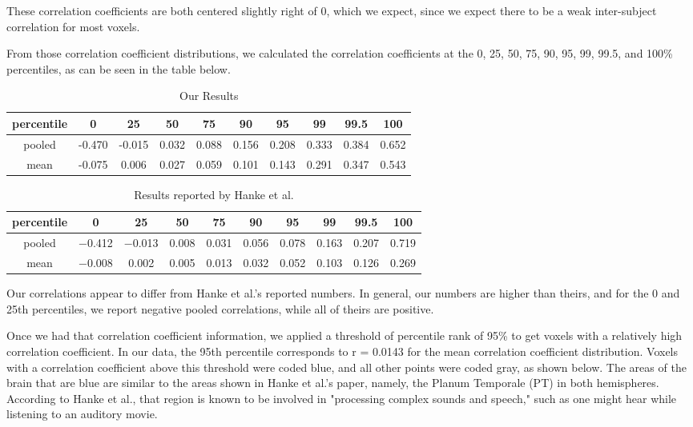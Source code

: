 \documentclass[11pt]{article}
\begin{document}
These correlation coefficients are both centered slightly right of
0, which we expect, since we expect there to be a weak inter-subject
correlation for most voxels.

From those correlation coefficient distributions, we calculated the 
correlation coefficients at the 0, 25, 50, 75, 90, 95, 99, 99.5, and 100\%
percentiles, as can be seen in the table below.
\begin{table}[ht]
  \centering
  \caption{Our Results}
  \label{tab:table1}
  \begin{tabular}{cccccccccc}
    percentile & 0 & 25 & 50 & 75 & 90 & 95 & 99 & 99.5 & 100\\
    \hline
    pooled & -0.470 & -0.015 & 0.032 & 0.088 & 0.156 & 0.208 & 0.333 & 0.384 & 0.652\\
    \hline
    mean & -0.075 & 0.006 & 0.027 & 0.059 & 0.101 & 0.143 & 0.291 & 0.347 & 0.543\\
  \end{tabular}
\end{table}

\begin{table}[ht]
  \centering
  \caption{Results reported by Hanke et al.}
  \label{tab:table2}
  \begin{tabular}{cccccccccc}
    percentile & 0 & 25 & 50 & 75 & 90 & 95 & 99 & 99.5 & 100\\
    \hline
    pooled & −0.412 & −0.013 & 0.008 & 0.031 & 0.056 & 0.078 & 0.163 & 0.207 & 0.719\\
    \hline
    mean & −0.008 & 0.002 & 0.005 & 0.013 & 0.032 & 0.052 & 0.103 & 0.126 & 0.269\\
  \end{tabular}
\end{table}

Our correlations appear to differ from Hanke et al.'s reported numbers.  In 
general, our numbers are higher than theirs, and for the 0 and 25th percentiles, 
we report negative pooled correlations, while all of theirs are positive.

Once we had that correlation coefficient information, we applied a threshold of 
percentile rank of 95\% to get voxels with a relatively high correlation 
coefficient.  In our data, the 95th percentile corresponds to r = 0.0143 for 
the mean correlation coefficient distribution.  Voxels with a correlation
coefficient above this threshold were coded blue, and all other points 
were coded gray, as shown below.  The areas of the brain that are blue
are similar to the areas shown in Hanke et al.'s paper, namely, the
Planum Temporale (PT) in both hemispheres.  According to Hanke et al., 
that region is known to be involved in "processing complex sounds and
speech," such as one might hear while listening to an auditory movie.
\end{document}
